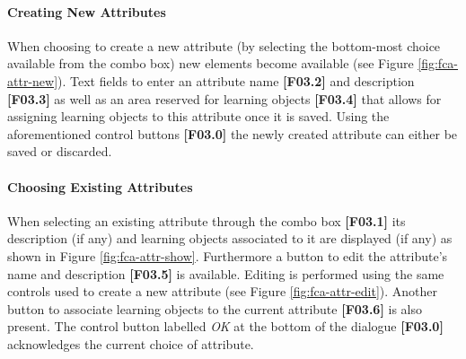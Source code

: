 \documentclass[a4paper,11pt]{article}
\begin{document}
\paragraph*{Creating New Attributes\\}
When choosing to create a new attribute (by selecting the bottom-most choice available from the combo box) new elements become available (see Figure \ref{fig:fca-attr-new}). Text fields to enter an attribute name \textbf{[F03.2]} and description \textbf{[F03.3]} as well as an area reserved for learning objects \textbf{[F03.4]} that allows for assigning learning objects to this attribute once it is saved. Using the aforementioned control buttons \textbf{[F03.0]} the newly created attribute can either be saved or discarded.
\paragraph*{Choosing Existing Attributes\\}
When selecting an existing attribute through the combo box \textbf{[F03.1]} its description (if any) and learning objects associated to it are displayed (if any) as shown in Figure \ref{fig:fca-attr-show}. Furthermore a button to edit the attribute's name and description \textbf{[F03.5]} is available. Editing is performed using the same controls used to create a new attribute (see Figure \ref{fig:fca-attr-edit}).
Another button to associate learning objects to the current attribute \textbf{[F03.6]} is also present. The control button labelled \emph{OK} at the bottom of the dialogue \textbf{[F03.0]} acknowledges the current choice of attribute.
\end{document}

